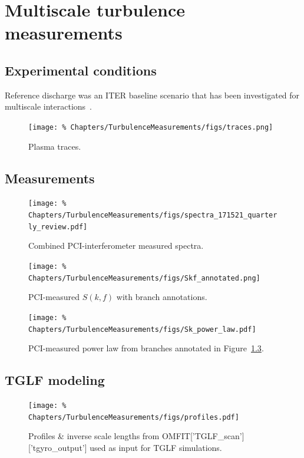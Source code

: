 \chapter{Multiscale turbulence measurements}
\label{ch:TurbulenceMeasurements}


\section{Experimental conditions}
Reference discharge was an ITER baseline scenario
that has been investigated for multiscale interactions~\cite{holland_nf17}.

\begin{figure}[h!]
  \centering
  \texttt{[image: \%
    Chapters/TurbulenceMeasurements/figs/traces.png]}
  \caption[Plasma traces]{%
    Plasma traces.
  }
\label{fig:TurbulenceMeasurements:traces}
\end{figure}


\section{Measurements}
\begin{figure}[h!]
  \centering
  \texttt{[image: \%
    Chapters/TurbulenceMeasurements/figs/spectra\_171521\_quarterly\_review.pdf]}
  \caption[Combined PCI-interferometer measured spectra]{%
    Combined PCI-interferometer measured spectra.
  }
\label{fig:TurbulenceMeasurements:spectra_quarterly_review}
\end{figure}

\begin{figure}[h!]
  \centering
  \texttt{[image: \%
    Chapters/TurbulenceMeasurements/figs/Skf\_annotated.png]}
  \caption[PCI-measured $S(k, f)$ with branch annotations]{%
    PCI-measured $S(k, f)$ with branch annotations.
  }
\label{fig:TurbulenceMeasurements:Skf_annotated}
\end{figure}

\begin{figure}[h!]
  \centering
  \texttt{[image: \%
    Chapters/TurbulenceMeasurements/figs/Sk\_power\_law.pdf]}
  \caption[PCI-measured power law]{%
    PCI-measured power law from branches annotated in
    Figure~\ref{fig:TurbulenceMeasurements:Skf_annotated}.
  }
\label{fig:TurbulenceMeasurements:Sk_power_law}
\end{figure}


\section{TGLF modeling}
\begin{figure}[h!]
  \centering
  \texttt{[image: \%
    Chapters/TurbulenceMeasurements/figs/profiles.pdf]}
  \caption[Profiles \& inverse scale lengths]{%
    Profiles \& inverse scale lengths from
    OMFIT['TGLF\_scan']['tgyro\_output']
    used as input for TGLF simulations.
  }
\label{fig:TurbulenceMeasurements:profiles}
\end{figure}

